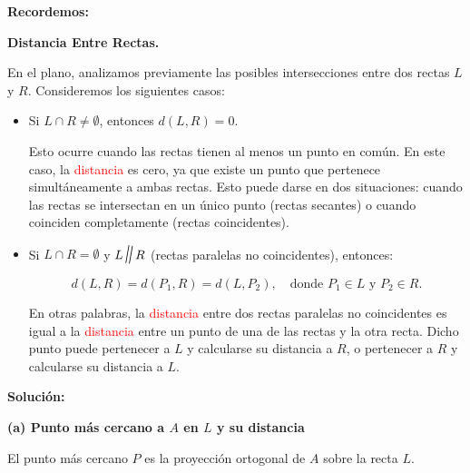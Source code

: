 \documentclass[11pt]{article}
\newcommand{\paralela}{\rotatebox[origin=c]{-10}{\Large$\parallel$}}
\begin{document}
\begin{enumerate}[\hspace{-5mm} 1) ]
\textbf{Recordemos:}

\textbf{\textbf{\textcolor{green!80!blue!50!}{Distancia Entre Rectas.}}}

En el plano, analizamos previamente las posibles intersecciones entre dos rectas \( L \) y \( R \). Consideremos los siguientes casos:

\begin{itemize}
    \item[\checkmark] Si \( L \cap R \neq \emptyset \), entonces \( d(L,R) = 0 \).
    
  {\footnotesize  Esto ocurre cuando las rectas tienen al menos un punto en común. En este caso, la  \textcolor{red}{distancia}  es cero, ya que existe un punto que pertenece simultáneamente a ambas rectas. Esto puede darse en dos situaciones: cuando las rectas se intersectan en un único punto (rectas secantes) o cuando coinciden completamente (rectas coincidentes).}
    
    \item[\checkmark] Si \( L \cap R = \emptyset \) y \( L \paralela R \) (rectas paralelas no coincidentes), entonces:
    
    \[
    d(L,R) = d(P_1, R) = d(L, P_2), \quad \text{donde } P_1 \in L \text{ y } P_2 \in R .
    \]

{\footnotesize En otras palabras, la \textcolor{red}{distancia} entre dos rectas paralelas no coincidentes es igual a la \textcolor{red}{distancia} entre un punto de una de las rectas y la otra recta. Dicho punto puede pertenecer a \( L \) y calcularse su distancia a \( R \), o pertenecer a \( R \) y calcularse su distancia a \( L \).}


\end{itemize}

\textbf{Solución:}



\textbf{(a) Punto más cercano a $A$ en $L$ y su distancia}


El punto más cercano $P$ es la proyección ortogonal de $A$ sobre la recta $L$. 

\begin{minipage}{.3\textwidth}

\begin{center}
\end{center}
\end{minipage}
\end{enumerate}
\end{document}
